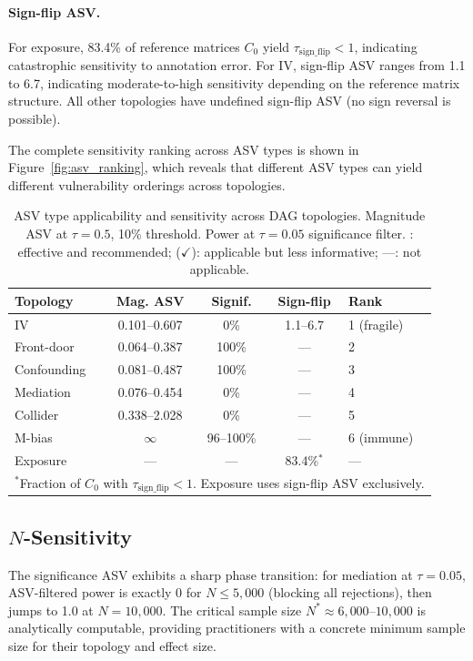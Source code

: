 \paragraph{Sign-flip ASV.}
For exposure, 83.4\% of reference matrices $C_0$ yield $\tau_{\text{sign\_flip}} < 1$, indicating catastrophic sensitivity to annotation error. For IV, sign-flip ASV ranges from 1.1 to 6.7, indicating moderate-to-high sensitivity depending on the reference matrix structure. All other topologies have undefined sign-flip ASV (no sign reversal is possible).

The complete sensitivity ranking across ASV types is shown in Figure~\ref{fig:asv_ranking}, which reveals that different ASV types can yield different vulnerability orderings across topologies.

\begin{table}[t]
\centering
\caption{ASV type applicability and sensitivity across DAG topologies. Magnitude ASV at $\tau{=}0.5$, 10\% threshold. Power at $\tau{=}0.05$ significance filter. \checkmark: effective and recommended; ($\checkmark$): applicable but less informative; ---: not applicable.}
\label{tab:asv_grid}
\small
\begin{tabular}{lcccl}
\toprule
\textbf{Topology} & \textbf{Mag. ASV} & \textbf{Signif.} & \textbf{Sign-flip} & \textbf{Rank} \\
\midrule
IV & 0.101--0.607 & 0\% & 1.1--6.7 & 1 (fragile) \\
Front-door & 0.064--0.387 & 100\% & --- & 2 \\
Confounding & 0.081--0.487 & 100\% & --- & 3 \\
Mediation & 0.076--0.454 & 0\% & --- & 4 \\
Collider & 0.338--2.028 & 0\% & --- & 5 \\
M-bias & $\infty$ & 96--100\% & --- & 6 (immune) \\
Exposure & --- & --- & 83.4\%$^*$ & --- \\
\bottomrule
\multicolumn{5}{l}{\scriptsize $^*$Fraction of $C_0$ with $\tau_{\text{sign\_flip}} < 1$. Exposure uses sign-flip ASV exclusively.}
\end{tabular}
\end{table}

\subsection{$N$-Sensitivity}
\label{sec:n_sensitivity}

The significance ASV exhibits a sharp phase transition: for mediation at $\tau{=}0.05$, ASV-filtered power is exactly 0 for $N{\leq}5{,}000$ (blocking all rejections), then jumps to 1.0 at $N{=}10{,}000$. The critical sample size $N^* \approx 6{,}000$--$10{,}000$ is analytically computable, providing practitioners with a concrete minimum sample size for their topology and effect size.

